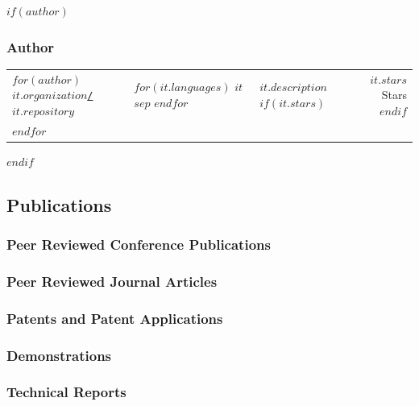 \documentclass{article}
\begin{document}
$if(author)$
\subsubsection*{Author}
\begin{tabularx}{\textwidth}{llXr}
$for(author)$
  \href{$it.host$/$it.organization$/$it.repository$}{\texttt{$it.organization$/$it.repository$}} & $for(it.languages)$ $it$ $sep$ $endfor$ & $it.description$ $if(it.stars)$ & $it.stars$ Stars$endif$ \\
$endfor$
\end{tabularx}
$endif$

\pagebreak

\subsection*{Publications}
\nocite{*}

\subsubsection*{Peer Reviewed Conference Publications}
\printbibliography[heading=none, resetnumbers=true, keyword={conference}]

\subsubsection*{Peer Reviewed Journal Articles}
\printbibliography[heading=none, resetnumbers=true, keyword={journal}]

\subsubsection*{Patents and Patent Applications}
\printbibliography[heading=none, resetnumbers=true, keyword={patent}]

\subsubsection*{Demonstrations}
\printbibliography[heading=none, resetnumbers=true, keyword={demo}]

\subsubsection*{Technical Reports}
\printbibliography[heading=none, resetnumbers=true, keyword={report}]
\end{document}
